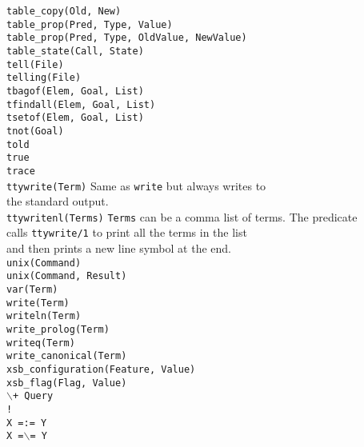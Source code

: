 \begin{tabbing}
 \> {\tt table\_copy(Old, New)}	\>					\\
 \> {\tt table\_prop(Pred, Type, Value)} \>				\\
 \> {\tt table\_prop(Pred, Type, OldValue, NewValue)} \>		\\
 \> {\tt table\_state(Call, State)} \>					\\
 \> {\tt tell(File)}		\>					\\
 \> {\tt telling(File)}		\>					\\
 \> {\tt tbagof(Elem, Goal, List)} \>					\\
 \> {\tt tfindall(Elem, Goal, List)} \>					\\
 \> {\tt tsetof(Elem, Goal, List)} \>					\\
 \> {\tt tnot(Goal)}		\>					\\
 \> {\tt told}			\>					\\
 \> {\tt true}			\>					\\
 \> {\tt trace}			\>					\\
 \> {\tt ttywrite(Term)}	\> Same as {\tt write} but always writes to \\
 \>				\> the standard output.			\\
 \> {\tt ttywritenl(Terms)}	\>
		{\tt Terms} can be a comma list of terms. The predicate	\\
 \>	\>	calls {\tt ttywrite/1} to print all the terms in the list \\
 \>	\>	and then prints a new line symbol at the end.		\\
 \> {\tt unix(Command)}		\>					\\
 \> {\tt unix(Command, Result)}	\>					\\
 \> {\tt var(Term)}		\>					\\
 \> {\tt write(Term)}		\>					\\
 \> {\tt writeln(Term)}		\>					\\
 \> {\tt write\_prolog(Term)}	\>					\\
 \> {\tt writeq(Term)}		\>					\\
 \> {\tt write\_canonical(Term)} \>					\\
 \> {\tt xsb\_configuration(Feature, Value)} \>				\\
 \> {\tt xsb\_flag(Flag, Value)} \>					\\
 \> {\tt $\backslash$+ Query}	\>					\\
 \> {\tt !}			\>					\\
 \> {\tt X =:= Y}		\>					\\
 \> {\tt X =$\backslash$= Y}	\>					\\

\end{tabbing}
